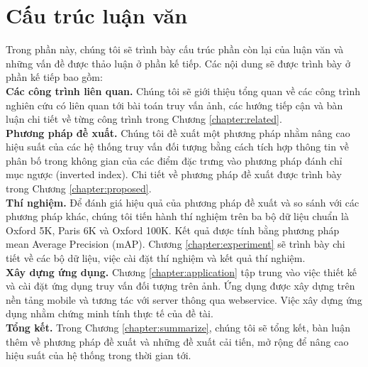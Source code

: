 \section{Cấu trúc luận văn}
Trong phần này, chúng tôi sẽ trình bày cấu trúc phần còn lại của luận văn và những vấn đề được thảo luận ở phần kế tiếp. Các nội dung sẽ được trình bày ở phần kế tiếp bao gồm:\\
 \textbf{Các công trình liên quan.} Chúng tôi sẽ giới thiệu tổng quan về các công trình nghiên cứu có liên quan tới bài toán truy vấn ảnh, các hướng tiếp cận và bàn luận chi tiết về từng công trình trong Chương \ref{chapter:related}.\\
 \textbf{Phương pháp đề xuất.} Chúng tôi đề xuất một phương pháp nhằm nâng cao hiệu suất của các hệ thống truy vấn đối tượng bằng cách tích hợp thông tin về phân bố trong không gian của các điểm đặc trưng vào phương pháp đánh chỉ mục ngược (inverted index). Chi tiết về phương pháp đề xuất được trình bày trong Chương \ref{chapter:proposed}.\\
 \textbf{Thí nghiệm.} Để đánh giá hiệu quả của phương pháp đề xuất và so sánh với các phương pháp khác, chúng tôi tiến hành thí nghiệm trên ba bộ dữ liệu chuẩn là Oxford 5K, Paris 6K và Oxford 100K. Kết quả được tính bằng phương pháp mean Average Precision (mAP). Chương \ref{chapter:experiment} sẽ trình bày chi tiết về các bộ dữ liệu, việc cài đặt thí nghiệm và kết quả thí nghiệm.\\
 \textbf{Xây dựng ứng dụng.} Chương \ref{chapter:application} tập trung vào việc thiết kế và cài đặt ứng dụng truy vấn đối tượng trên ảnh. Ứng dụng được xây dựng trên nền tảng mobile và tương tác với server thông qua webservice. Việc xây dựng ứng dụng nhằm chứng minh tính thực tế của đề tài.\\
 \textbf{Tổng kết.} Trong Chương \ref{chapter:summarize}, chúng tôi sẽ tổng kết, bàn luận thêm về phương pháp đề xuất và những đề xuất cải tiến, mở rộng để nâng cao hiệu suất của hệ thống trong thời gian tới.
 
